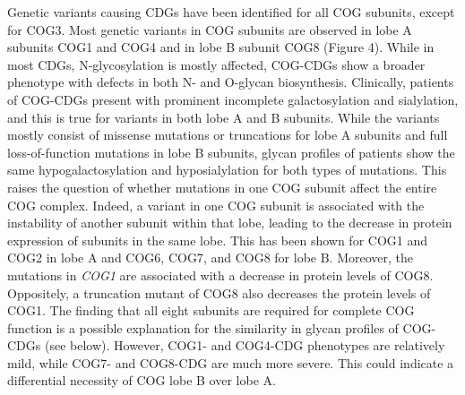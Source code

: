 Genetic variants causing CDGs have been identified for all COG subunits, except for COG3\cite{blackburn_maintaining_2019,reynders_how_2011,kodera_mutations_2015}. Most genetic variants in COG subunits are observed in lobe A subunits COG1 and COG4 and in lobe B subunit COG8 (Figure 4). While in most CDGs, N-glycosylation is mostly affected, COG-CDGs show a broader phenotype with defects in both N- and O-glycan biosynthesis\cite{reynders_how_2011}. Clinically, patients of COG-CDGs present with prominent incomplete galactosylation and sialylation\cite{reynders_how_2011,foulquier_conserved_2006}, and this is true for variants in both lobe A and B subunits. While the variants mostly consist of missense mutations or truncations for lobe A subunits and full loss-of-function mutations in lobe B subunits, glycan profiles of patients show the same hypogalactosylation and hyposialylation for both types of mutations\cite{palmigiano_maldi-ms_2017,abu_bakar_clinical_2018}. This raises the question of whether mutations in one COG subunit affect the entire COG complex. Indeed, a variant in one COG subunit is associated with the instability of another subunit within that lobe, leading to the decrease in protein expression of subunits in the same lobe\cite{foulquier_cog_2009}. This has been shown for COG1\cite{foulquier_conserved_2006} and COG2\cite{kodera_mutations_2015} in lobe A and COG6, COG7\cite{morava_common_2007,ng_molecular_2007}, and COG8\cite{kranz_cog8_2007} for lobe B. Moreover, the mutations in \emph{COG1} are associated with a decrease in protein levels of COG8\cite{foulquier_conserved_2006}. Oppositely, a truncation mutant of COG8 also decreases the protein levels of COG1\cite{foulquier_new_2007}. The finding that all eight subunits are required for complete COG function is a possible explanation for the similarity in glycan profiles of COG-CDGs (see below). However, COG1- and COG4-CDG phenotypes are relatively mild, while COG7- and COG8-CDG are much more severe. This could indicate a differential necessity of COG lobe B over lobe A.

